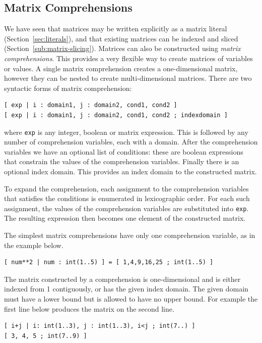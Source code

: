 \documentclass[a4paper]{article}
\begin{document}
\subsection{Matrix Comprehensions}\label{sec:comprehensions}

We have seen that matrices may be written explicitly as a matrix literal (Section~\ref{sec:literals}), and 
that existing matrices can be indexed and sliced (Section~\ref{sub:matrix-slicing}).  Matrices
can also be constructed using \textit{matrix comprehensions}. This provides a 
very flexible way to create matrices of variables or values. A single 
matrix comprehension creates a one-dimensional matrix, however they can be
nested to create multi-dimensional matrices. There are two syntactic forms of matrix
comprehension:

\begin{verbatim}
[ exp | i : domain1, j : domain2, cond1, cond2 ]
[ exp | i : domain1, j : domain2, cond1, cond2 ; indexdomain ]
\end{verbatim}

where \texttt{exp} is any integer, boolean or matrix expression. 
This is followed by any number of comprehension variables, each with a domain.
After the comprehension variables we have an optional list of conditions: these
are boolean expressions that constrain the values of the comprehension variables. 
Finally there is an optional index domain. This provides an index domain to the 
constructed matrix. 

To expand the comprehension, each assignment to the comprehension 
variables that satisfies the conditions is enumerated in lexicographic order. 
For each such assignment, the values of the comprehension variables are substituted into \texttt{exp}.
The resulting expression then becomes one element of the constructed matrix.

The simplest matrix comprehensions have only one comprehension variable, as in the example
below. 

\begin{verbatim}
[ num**2 | num : int(1..5) ] = [ 1,4,9,16,25 ; int(1..5) ]
\end{verbatim}

The matrix constructed by a comprehension is one-dimensional and is either indexed
from 1 contiguously, or has the given index domain. The given domain must have a lower bound
but is allowed to have no upper bound. 
For example the first line below produces the matrix on the second line. 

\begin{verbatim}
[ i+j | i: int(1..3), j : int(1..3), i<j ; int(7..) ]
[ 3, 4, 5 ; int(7..9) ]
\end{verbatim}
\end{document}
